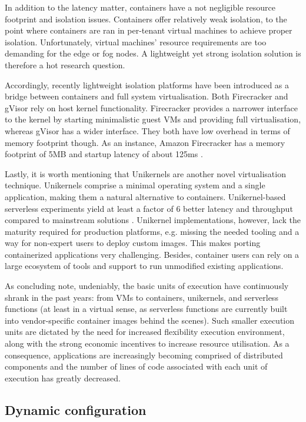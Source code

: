 In addition to the latency matter, containers have a not negligible resource footprint and isolation issues. Containers offer relatively weak isolation, to the point where containers are ran in per-tenant virtual machines to achieve proper isolation. Unfortunately, virtual machines' resource requirements are too demanding for the edge or fog nodes. A lightweight yet strong isolation solution is therefore a hot research question.

Accordingly, recently lightweight isolation platforms have been introduced as a bridge between containers and full system virtualisation. Both Firecracker and gVisor \cite{gvisor-firecracker} rely on host kernel functionality. Firecracker provides a narrower interface to the kernel by starting minimalistic guest VMs and providing full virtualisation, whereas gVisor has a wider interface. They both have low overhead in terms of memory footprint though. As an instance, Amazon Firecracker has a memory footprint of 5MB and startup latency of about 125ms \cite{firecracker}.

Lastly, it is worth mentioning that Unikernels \cite{unikernels} are another novel virtualisation technique. Unikernels comprise a minimal operating system and a single application, making them a natural alternative to containers. Unikernel-based serverless experiments yield at least a factor of 6 better latency and throughput compared to mainstream solutions \cite{unikernels-performance}. Unikernel implementations, however, lack the maturity required for production platforms, e.g. missing the needed tooling and a way for non-expert users to deploy custom images. This makes porting containerized applications very challenging. Besides, container users can rely on a large ecosystem of tools and support to run unmodified existing applications.

As concluding note, undeniably, the basic units of execution have continuously shrank in the past years: from VMs to containers, unikernels, and serverless functions (at least in a virtual sense, as serverless functions are currently built into vendor-specific container images behind the scenes). Such smaller execution units are dictated by the need for increased flexibility execution environment, along with the strong economic incentives to increase resource utilisation. As a consequence, applications are increasingly becoming comprised of distributed components and the number of lines of code associated with each unit of execution has greatly decreased.

\subsection{Dynamic configuration}

